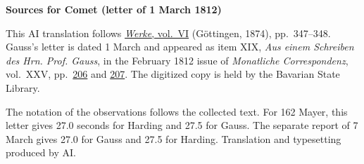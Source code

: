 \clearpage\thispagestyle{empty}
\begin{center}\textbf{Sources for Comet (letter of 1 March 1812)}\end{center}
\noindent This AI translation follows \href{https://gdz.sub.uni-goettingen.de/id/PPN236007467}{\textit{Werke}, vol.~VI} (Göttingen, 1874), pp.~347--348. Gauss’s letter is dated 1 March and appeared as item XIX, \textit{Aus einem Schreiben des Hrn. Prof. Gauss}, in the February 1812 issue of \textit{Monatliche Correspondenz}, vol.~XXV, pp.~\href{https://api.digitale-sammlungen.de/iiif/image/v2/bsb10538614_00214/full/1600,/0/default.jpg}{206} and \href{https://api.digitale-sammlungen.de/iiif/image/v2/bsb10538614_00215/full/1600,/0/default.jpg}{207}. The digitized copy is held by the Bavarian State Library.
\par\smallskip\noindent The notation of the observations follows the collected text. For 162 Mayer, this letter gives 27.0 seconds for Harding and 27.5 for Gauss. The separate report of 7 March gives 27.0 for Gauss and 27.5 for Harding. Translation and typesetting produced by AI.
\clearpage
